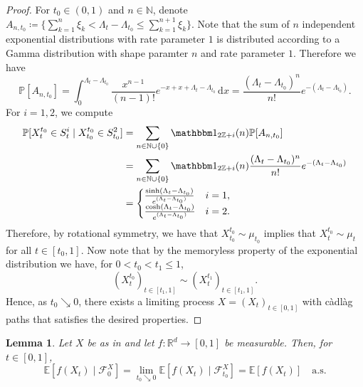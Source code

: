 \documentclass[12pt,oneside]{amsart}
\newtheorem{lemma}[theorem]{Lemma}
\theoremstyle{definition}
\newcommand{\F}{\mathcal F}
\newcommand{\D}{\mathrm{d}}
\newcommand{\N}{\mathbb N}
\newcommand{\R}{\mathbb R}
\def\P{{\mathbb P}}
\def\E{{\mathbb E}}
\def\R{{\mathbb R}}
\numberwithin{equation}{section}
\begin{document}
\begin{proof}
	For $t_0 \in (0, 1)$ and $n \in \N$, denote $A_{n,t_0} \coloneqq \{ \sum_{k = 1}^n \xi_k < \Lambda_t - \Lambda_{t_0} \le \sum_{k = 1}^{n + 1} \xi_k \}$. Note that the sum of $n$ independent exponential distributions with rate parameter $1$ is distributed according to a Gamma distribution with shape paramter $n$ and rate parameter $1$.
        Therefore we have
        \begin{equation}
            \label{eq:rem.probs}
            \mathbb P[A_{n,t_0}] = \int_0^{\Lambda_{t} - \Lambda_{t_0}} \frac{x^{n-1}}{(n-1)!} e^{-x + x + \Lambda_{t} - \Lambda_{t_0}} \, \D x
            =
            \frac{(\Lambda_t - \Lambda_{t_0})^n}{n!} e^{-(\Lambda_t - \Lambda_{t_0})}.
        \end{equation}
	For $i = 1, 2$, we compute
    \begin{align}
        \mathbb P[ X_t^{t_0} \in S_t^i \mid X^{t_0}_{t_0} \in S_{t_0}^2] 
        &= \sum_{n \in \N \cup \{ 0 \} }\mathbbm 1_{2\mathbb Z + i }(n) \P \!\left[ A_{n, t_0}\right]\!
        \\
        &= \sum_{n \in \N \cup \{0 \} }\mathbbm 1_{2 \mathbb Z + i}(n) \frac{(\Lambda_t - \Lambda_{t_0})^n}{n!} e^{-(\Lambda_t - \Lambda_{t_0})}
        \\
        &=
        \begin{cases}
            \frac{\sinh(\Lambda_t - \Lambda_{t_0})}{e^{(\Lambda_t - \Lambda_{t_0})}} & i = 1,
            \\
            \frac{\cosh(\Lambda_t - \Lambda_{t_0})}{e^{(\Lambda_t - \Lambda_{t_0})}} & i = 2.
        \end{cases}
    \end{align}
    Therefore, by rotational symmetry, we have that $X^{t_0}_{t_0} \sim \mu_{t_0}$ implies that $X_t^{t_0} \sim \mu_t$ for all $t \in [t_0,1]$.
    Now note that by the memoryless property of the exponential distribution we have, for $0 < t_0 < t_1 \le 1$,
    \begin{equation}
        (X_t^{t_0})_{t \in [t_1,1]} \sim (X^{t_1}_t)_{t \in [t_1,1]}.
    \end{equation}
    Hence, as $t_0 \searrow 0$, there exists a limiting process $X = (X_t)_{t \in [0,1]}$ with c\`adl\`ag paths that satisfies the desired properties.
\end{proof}

\begin{lemma}\label{lem:app-rem-2}
	Let $X$ be as in  and let $f \colon \R^d \to [0,1]$ be measurable. Then, for $t \in [0,1]$,
    \begin{equation}\label{eq:rem-claim}
        \E[f(X_{t}) \mid \F^X_0] = \lim_{t_0 \searrow 0} \E[f(X_{t}) \mid \mathcal F^X_{t_0} ] = \E[f(X_{t})]\quad \mbox{a.s.}
    \end{equation}
\end{lemma}
\end{document}

